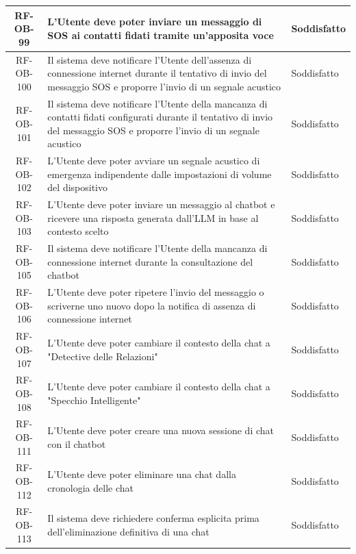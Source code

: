 \documentclass[a4paper,12pt]{article}
\begin{document}
\begin{center}
\begin{longtable}{|c|p{8.5cm}|>{\centering\arraybackslash}p{4cm}|}
RF-OB-99 & L'Utente deve poter inviare un messaggio di SOS ai contatti fidati tramite un'apposita voce & Soddisfatto \\
\hline

RF-OB-100 & Il sistema deve notificare l'Utente dell'assenza di connessione internet durante il tentativo di invio del messaggio SOS e proporre l'invio di un segnale acustico & Soddisfatto \\
\hline

RF-OB-101 & Il sistema deve notificare l'Utente della mancanza di contatti fidati configurati durante il tentativo di invio del messaggio SOS e proporre l'invio di un segnale acustico & Soddisfatto \\
\hline

RF-OB-102 & L'Utente deve poter avviare un segnale acustico di emergenza indipendente dalle impostazioni di volume del dispositivo & Soddisfatto \\
\hline

RF-OB-103 & L'Utente deve poter inviare un messaggio al chatbot e ricevere una risposta generata dall'LLM in base al contesto scelto & Soddisfatto \\
\hline

RF-OB-105 & Il sistema deve notificare l'Utente della mancanza di connessione internet durante la consultazione del chatbot & Soddisfatto \\
\hline

RF-OB-106 & L'Utente deve poter ripetere l'invio del messaggio o scriverne uno nuovo dopo la notifica di assenza di connessione internet & Soddisfatto \\
\hline

RF-OB-107 & L'Utente deve poter cambiare il contesto della chat a "Detective delle Relazioni" & Soddisfatto \\
\hline

RF-OB-108 & L'Utente deve poter cambiare il contesto della chat a "Specchio Intelligente" & Soddisfatto \\
\hline

RF-OB-111 & L'Utente deve poter creare una nuova sessione di chat con il chatbot & Soddisfatto \\
\hline

RF-OB-112 & L'Utente deve poter eliminare una chat dalla cronologia delle chat & Soddisfatto \\
\hline

RF-OB-113 & Il sistema deve richiedere conferma esplicita prima dell'eliminazione definitiva di una chat & Soddisfatto \\
\hline


\end{longtable}
\end{center}
\end{document}
